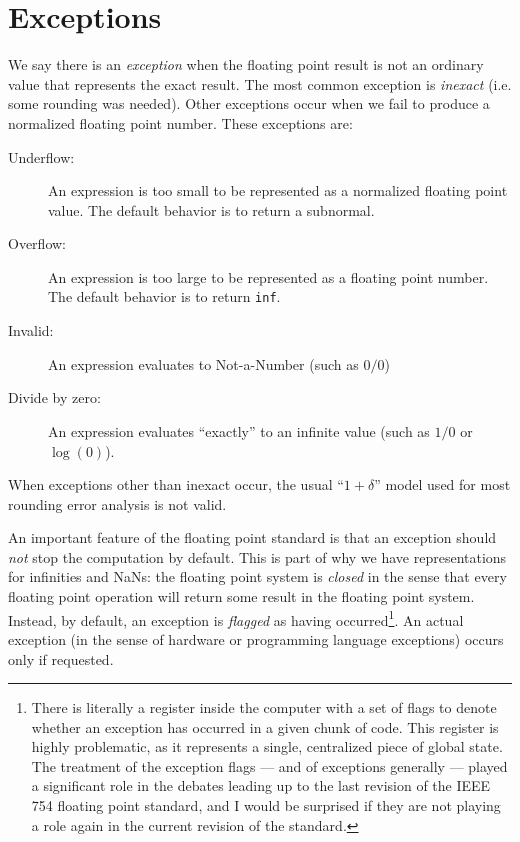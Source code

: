 \section{Exceptions}

We say there is an {\em exception} when the floating point result is
not an ordinary value that represents the exact result.  The most
common exception is {\em inexact} (i.e. some rounding was needed).
Other exceptions occur when we fail to produce a normalized floating
point number.  These exceptions are:
\begin{description}
\item[Underflow:]
  An expression is too small to be represented as a normalized floating
  point value.  The default behavior is to return a subnormal.
\item[Overflow:]
  An expression is too large to be represented as a floating point
  number.  The default behavior is to return {\tt inf}.
\item[Invalid:]
  An expression evaluates to Not-a-Number (such as $0/0$)
\item[Divide by zero:]
  An expression evaluates ``exactly'' to an infinite value
  (such as $1/0$ or $\log(0)$).
\end{description}
When exceptions other than inexact occur, the usual ``$1 + \delta$''
model used for most rounding error analysis is not valid.

An important feature of the floating point standard is that an
exception should {\em not} stop the computation by default.  This
is part of why we have representations for infinities and NaNs:
the floating point system is {\em closed} in the sense that every
floating point operation will return some result in the floating
point system.  Instead, by default, an exception is {\em flagged}
as having occurred\footnote{%
There is literally a register inside the computer with a set of
flags to denote whether an exception has occurred in a given
chunk of code.  This register is highly problematic, as it
represents a single, centralized piece of global state.  The
treatment of the exception flags --- and of exceptions generally ---
played a significant role in the debates leading up to the last revision
of the IEEE 754 floating point standard,
and I would be surprised if they are not playing a role again in the
current revision of the standard.
}.  An actual exception (in the sense of hardware
or programming language exceptions) occurs only if requested.
